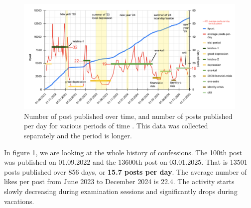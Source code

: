 \documentclass[
	12pt
] {article}
\begin{document}
	\begin{figure}[H]
		\centering
		\includegraphics[width=1\textwidth]{fig-post-n-vs-time}
		\caption{Number of post published over time, and number of posts published per day for various periods of time \cite{sheet-post-vs-time}. This data was collected separately and the period is longer.}
		\label{fig-post-n-vs-time}
	\end{figure}
	
	In figure \ref{fig-post-n-vs-time}, we are looking at the whole history of confessions. The 100th post was published on 01.09.2022 and the 13600th post on 03.01.2025. That is 13501 posts published over 856 days, or \textbf{\num{15.7} posts per day}. The average number of likes per post from June 2023 to December 2024 is \num{22.4}. The activity starts slowly decreasing during examination sessions and significantly drops during vacations.
	
\end{document}

